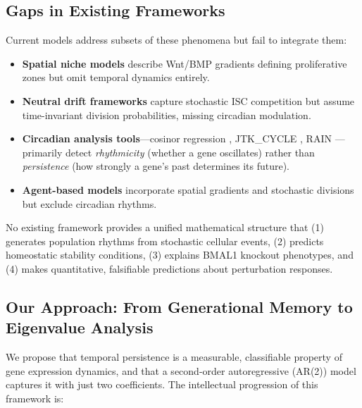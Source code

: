 \documentclass[11pt,letterpaper]{article}
\begin{document}
\subsection{Gaps in Existing Frameworks}

Current models address subsets of these phenomena but fail to integrate them:

\begin{itemize}
\item \textbf{Spatial niche models} \citep{clevers2012wnt} describe Wnt/BMP gradients defining proliferative zones but omit temporal dynamics entirely.
\item \textbf{Neutral drift frameworks} \citep{lopezgarcia2010intestinal, snippert2010intestinal} capture stochastic ISC competition but assume time-invariant division probabilities, missing circadian modulation.
\item \textbf{Circadian analysis tools}---cosinor regression \citep{cornelissen2014cosinor}, JTK\_CYCLE \citep{hughes2010jtk}, RAIN \citep{thaben2014detecting}---primarily detect \textit{rhythmicity} (whether a gene oscillates) rather than \textit{persistence} (how strongly a gene's past determines its future).
\item \textbf{Agent-based models} \citep{mukhtar2022multiscale} incorporate spatial gradients and stochastic divisions but exclude circadian rhythms.
\end{itemize}

No existing framework provides a unified mathematical structure that (1) generates population rhythms from stochastic cellular events, (2) predicts homeostatic stability conditions, (3) explains BMAL1 knockout phenotypes, and (4) makes quantitative, falsifiable predictions about perturbation responses.

\subsection{Our Approach: From Generational Memory to Eigenvalue Analysis}

We propose that temporal persistence is a measurable, classifiable property of gene expression dynamics, and that a second-order autoregressive (AR(2)) model captures it with just two coefficients. The intellectual progression of this framework is:
\end{document}
